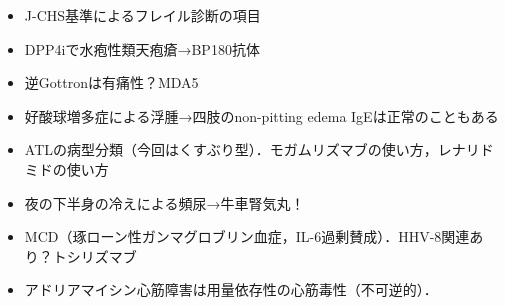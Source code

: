 \begin{itemize}
\item J-CHS基準によるフレイル診断の項目

\item DPP4iで水疱性類天疱瘡→BP180抗体
\item 逆Gottronは有痛性？MDA5
\item 好酸球増多症による浮腫→四肢のnon-pitting edema IgEは正常のこともある
\item ATLの病型分類（今回はくすぶり型）．モガムリズマブの使い方，レナリドミドの使い方
\item 夜の下半身の冷えによる頻尿→牛車腎気丸！
\item MCD（琢ローン性ガンマグロブリン血症，IL-6過剰賛成）．HHV-8関連あり？トシリズマブ
\item アドリアマイシン心筋障害は用量依存性の心筋毒性（不可逆的）．



\end{itemize}